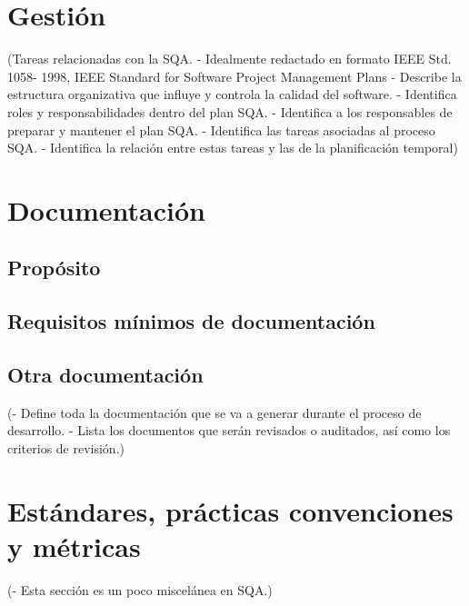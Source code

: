 \documentclass[spanish,a4paper,11pt, twoside]{report}	%
\begin{document}
\newpage
\mbox{}
\thispagestyle{empty}						%
\newpage

\chapter{ Gestión}%

	(Tareas relacionadas con la SQA.
	- Idealmente redactado en formato IEEE Std. 1058-
	1998, IEEE Standard for Software Project
	Management Plans
	- Describe la estructura organizativa que influye y
	controla la calidad del software.
	- Identifica roles y responsabilidades dentro del plan
	SQA.
	- Identifica a los responsables de preparar y mantener
	el plan SQA.
	- Identifica las tareas asociadas al proceso SQA.
	- Identifica la relación entre estas tareas y las de la
	planificación temporal)

\newpage
\mbox{}
\thispagestyle{empty}						%
\newpage

\chapter{ Documentación}
	\section{Propósito}
	\section{Requisitos mínimos de documentación}
	\section{Otra documentación}

	(- Define toda la documentación que se va a generar
	durante el proceso de desarrollo.
	- Lista los documentos que serán revisados o
	auditados, así como los criterios de revisión.)

\newpage
\mbox{}
\thispagestyle{empty}						%
\newpage

\chapter{ Estándares, prácticas convenciones y métricas}
	(- Esta sección es un poco miscelánea en SQA.) %

\newpage
\mbox{}
\thispagestyle{empty}						%
\newpage
\end{document}
